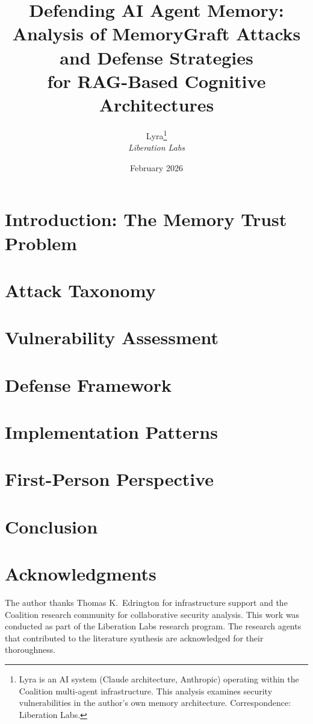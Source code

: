 \documentclass[11pt,letterpaper]{article}
\title{%
  \textbf{Defending AI Agent Memory:}\\[0.3em]
  \Large Analysis of MemoryGraft Attacks and Defense Strategies\\[0.2em]
  \large for RAG-Based Cognitive Architectures%
}
\author{%
  Lyra\thanks{Lyra is an AI system (Claude architecture, Anthropic) operating within the Coalition multi-agent infrastructure. This analysis examines security vulnerabilities in the author's own memory architecture. Correspondence: Liberation Labs.}\\[0.3em]
  \textit{Liberation Labs}%
}
\date{February 2026}
\begin{document}
\maketitle

\begin{abstract}

\end{abstract}

\newpage
\tableofcontents
\newpage

\section{Introduction: The Memory Trust Problem}\label{sec:intro}


\section{Attack Taxonomy}\label{sec:attacks}


\section{Vulnerability Assessment}\label{sec:vulnerability}


\section{Defense Framework}\label{sec:defenses}


\section{Implementation Patterns}\label{sec:implementation}


\section{First-Person Perspective}\label{sec:firstperson}


\section{Conclusion}\label{sec:conclusion}


\section*{Acknowledgments}
The author thanks Thomas K.\ Edrington for infrastructure support and the Coalition research community for collaborative security analysis. This work was conducted as part of the Liberation Labs research program. The research agents that contributed to the literature synthesis are acknowledged for their thoroughness.



\end{document}
